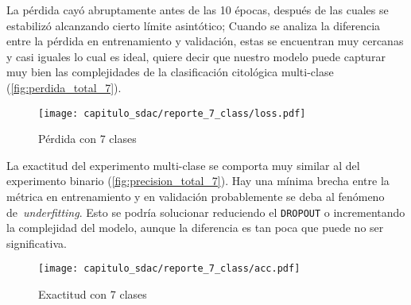\begin{table}[H]
    \centering
    \caption{Estadísticos del experimento multi-clase}\label{tabla:estadisticos7}
    \end{table}

La pérdida cayó abruptamente antes de las 10 épocas, después de las cuales se
estabilizó alcanzando cierto límite asintótico; Cuando se analiza la diferencia
entre la pérdida en entrenamiento y validación, estas se encuentran muy cercanas
y casi iguales lo cual es ideal, quiere decir que nuestro modelo puede capturar
muy bien las complejidades de la clasificación citológica multi-clase
(\autoref{fig:perdida_total_7}).

\begin{figure}[H]
    \centering
    \texttt{[image: capitulo\_sdac/reporte\_7\_class/loss.pdf]}
    \caption{Pérdida con 7 clases}\label{fig:perdida_total_7}
\end{figure}

La exactitud del experimento multi-clase se comporta muy similar al del
experimento binario (\autoref{fig:precision_total_7}). Hay una mínima brecha
entre la métrica en entrenamiento y en validación probablemente se deba al
fenómeno de~\emph{underfitting}. Esto se podría solucionar reduciendo el
\texttt{DROPOUT} o incrementando la complejidad del modelo, aunque la
diferencia es tan poca que puede no ser significativa.

\begin{figure}[H]
    \centering
    \texttt{[image: capitulo\_sdac/reporte\_7\_class/acc.pdf]}
    \caption{Exactitud con 7 clases}\label{fig:precision_total_7}
\end{figure}


